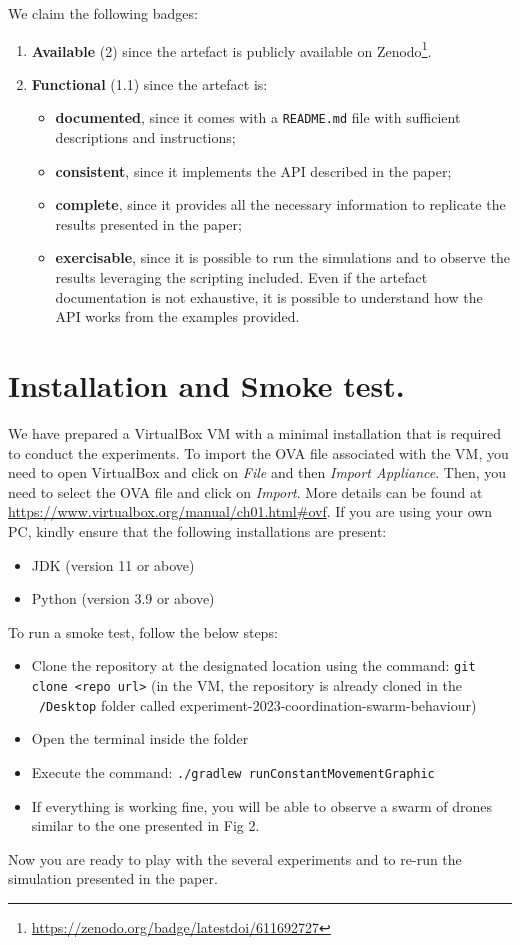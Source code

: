 \documentclass[runningheads]{llncs}
\begin{document}
We claim the following badges:
\begin{enumerate}
  \item[C.1] \textbf{Available} (2) since the artefact is publicly available on Zenodo\footnote{\url{https://zenodo.org/badge/latestdoi/611692727}}. 
  \item[C.2] \textbf{Functional} (1.1)  %
  since the artefact is:
  \begin{itemize}
  \item \textbf{documented}, since it comes with a \texttt{README.md} file with sufficient descriptions and instructions;
  \item \textbf{consistent}, since it implements the API described in the paper;
  \item \textbf{complete}, since it provides all the necessary information to replicate the results presented in the paper;
   \item \textbf{exercisable}, since it is possible to run the simulations and to observe the results leveraging the scripting included. Even if the artefact documentation is not exhaustive, it is possible to understand how the API works from the examples provided.
   \end{itemize}
\end{enumerate}

\section{Installation and Smoke test.} 

We have prepared a VirtualBox VM with a minimal installation that is required to conduct the experiments. To import the OVA file associated with the VM, you need to open VirtualBox and click on \textit{File} and then \textit{Import Appliance}. Then, you need to select the OVA file and click on \textit{Import}. More details can be found at \url{https://www.virtualbox.org/manual/ch01.html#ovf}.
If you are using your own PC, kindly ensure that the following installations are present:
\begin{itemize}
  \item JDK (version 11 or above)
  \item Python (version 3.9 or above)
\end{itemize}
To run a smoke test, follow the below steps:
\begin{itemize}
  \item Clone the repository at the designated location using the command: \lstinline|git clone <repo url>| (in the VM, the repository is already cloned in the \texttt{~/Desktop} folder called experiment-2023-coordination-swarm-behaviour)
  \item Open the terminal inside the folder
  \item Execute the command: \lstinline|./gradlew runConstantMovementGraphic|
  \item If everything is working fine, you will be able to observe a swarm of drones similar to the one presented in Fig 2.
\end{itemize}
Now you are ready to play with the several experiments and to re-run the simulation presented in the paper.
\end{document}
